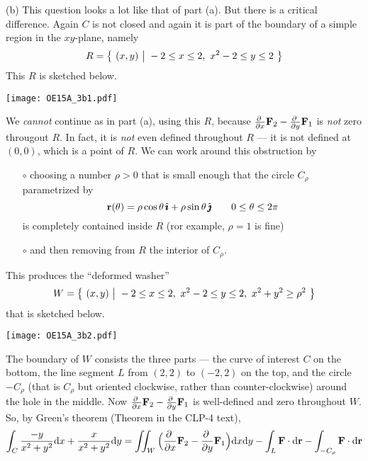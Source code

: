 \begin{solution}
(b) This question looks a lot like that of part (a). But there is
a critical difference. Again $C$ is not closed and again it is
part of the boundary of a simple region in the $xy$-plane, namely
\begin{equation*}
R = \Set{(x,y)}{-2\le x\le 2,\ x^2-2\le y\le 2}
\end{equation*}
This $R$ is sketched below.
 \begin{center}
    \texttt{[image: OE15A\_3b1.pdf]}
\end{center}
We \emph{cannot} continue as in part (a), using this $R$, because 
$\pdiff{}{x} \vF_2 - 
\pdiff{}{y} \vF_1 $ is \emph{not} zero througout $R$.
In fact, it is \emph{not} even defined throughout $R$ --- it is not defined
at $(0,0)$, which is a point of $R$. We can work around this obstruction
by 
\begin{itemize}\itemsep1pt \parskip0pt  %
\item[$\circ$]
choosing a number $\rho>0$ that is small enough that the circle
$C_\rho$ parametrized by
\begin{equation*}
\mathbf{r}(\theta) = \rho\cos\theta\,\hat{\pmb{\imath}} +\rho\sin\theta\,\hat{\pmb{\jmath}}\qquad
0\le \theta \le 2\pi
\end{equation*}
is completely contained inside $R$ (ror example, $\rho=1$ is fine)
\item[$\circ$]
and then removing from $R$ the interior of $C_\rho$. 
\end{itemize}
This produces the ``deformed washer''
\begin{equation*}
W = \big\{ \ (x,y)\ \big|\ -2\le x\le 2,\ x^2-2\le y\le 2,\ x^2+y^2\ge\rho^2\ \big\}
\end{equation*}
that is sketched below.
 \begin{center}
    \texttt{[image: OE15A\_3b2.pdf]}
\end{center}
The boundary of $W$ consists the three parts ---
 the curve of interest $C$ on the bottom, 
 the line segment $L$ from $(2,2)$ to $(-2,2)$ on the top,
 and the circle $-C_\rho$ (that is $C_\rho$ but oriented clockwise,
 rather than counter-clockwise) around the hole in the middle. Now 
$\pdiff{}{x} \vF_2 - 
\pdiff{}{y} \vF_1 $
is well-defined and zero throughout $W$. So, by Green's theorem 
(Theorem  in the CLP-4 text), 
\begin{align*}
\int_C \frac{-y}{x^2+y^2}\dee{x} + \frac{x}{x^2+y^2}\dee{y}
&=\dblInt_W \Big(\pdiff{}{x} \vF_2 - 
          \pdiff{}{y} \vF_1 \Big)\dee{x}\dee{y}
 - \int_L\vF\cdot\dee{\vr}- \int_{-C_\rho}\vF\cdot\dee{\vr} \\

\end{align*}
\end{solution}
